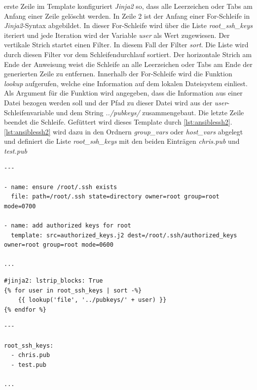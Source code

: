 \documentclass[titlepage]{report}
\begin{document}
erste Zeile im Template konfiguriert \emph{Jinja2} so, dass alle
Leerzeichen oder Tabs am Anfang einer Zeile gelöscht werden. In Zeile 2
ist der Anfang einer For\hyp{}Schleife in \emph{Jinja2}\hyp{}Syntax
abgebildet. In dieser For\hyp{}Schleife wird über die Liste
\emph{root\_ssh\_keys} iteriert und jede Iteration wird der Variable
\emph{user} als Wert zugewiesen. Der vertikale Strich startet einen
Filter. In diesem Fall der Filter \emph{sort}. Die Liste wird durch
diesen Filter vor dem Schleifendurchlauf sortiert. Der horizontale
Strich am Ende der Anweisung weist die Schleife an alle Leerzeichen oder
Tabs am Ende der generierten Zeile zu entfernen. Innerhalb der
For\hyp{}Schleife wird die Funktion \emph{lookup} aufgerufen, welche
eine Information auf dem lokalen Dateisystem einliest. Als Argument für
die Funktion wird angegeben, dass die Information aus einer Datei
bezogen werden soll und der Pfad zu dieser Datei wird aus der
\emph{user}\hyp{}Schleifenvariable und dem String \emph{../pubkeys/}
zusammengebaut. Die letzte Zeile beendet die Schleife. Gefüttert wird
dieses Template durch \autoref{lst:ansiblessh2}. 
\autoref{lst:ansiblessh2} wird dazu in den Ordnern \emph{group\_vars}
oder \emph{host\_vars} abgelegt und definiert die Liste
\emph{root\_ssh\_keys} mit den beiden Einträgen \emph{chris.pub} und
\emph{test.pub}
\begin{minipage}{\linewidth}
\begin{lstlisting}[caption={Beispiel eines Ansible Tasks},label={lst:ansiblessh}]
---

- name: ensure /root/.ssh exists
  file: path=/root/.ssh state=directory owner=root group=root mode=0700

- name: add authorized keys for root
  template: src=authorized_keys.j2 dest=/root/.ssh/authorized_keys owner=root group=root mode=0600

...
\end{lstlisting}
\end{minipage}
\begin{minipage}{\linewidth}
\begin{lstlisting}[caption={Beispiel eines Jinja2-Templates},label={lst:ansiblejinja2}]
#jinja2: lstrip_blocks: True
{% for user in root_ssh_keys | sort -%}
	{{ lookup('file', '../pubkeys/' + user) }}
{% endfor %}
\end{lstlisting}
\end{minipage}
\begin{minipage}{\linewidth}
\begin{lstlisting}[caption={Daten für das Jinja2-Template Beispiel},label={lst:ansiblessh2}]
---

root_ssh_keys:
  - chris.pub
  - test.pub

...
\end{lstlisting}
\end{minipage}
\end{document}
